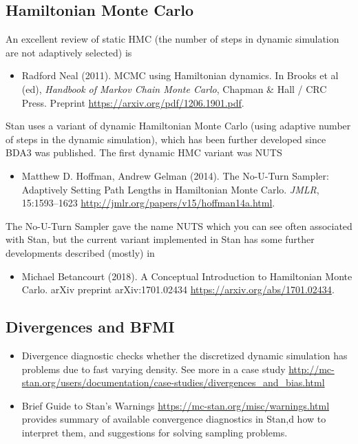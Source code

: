 \documentclass[a4paper,11pt,english]{article}
\begin{document}
\subsection*{Hamiltonian Monte Carlo}

An excellent review of static HMC (the number of steps in dynamic
simulation are not adaptively selected) is
\begin{itemize}
\item Radford Neal (2011). MCMC using Hamiltonian dynamics. In Brooks
  et al (ed), {\em Handbook of Markov Chain Monte Carlo}, Chapman \&
  Hall / CRC Press. Preprint \url{https://arxiv.org/pdf/1206.1901.pdf}.
\end{itemize}

Stan uses a variant of dynamic Hamiltonian Monte Carlo (using adaptive
number of steps in the dynamic simulation), which has been further
developed since BDA3 was published. The first dynamic HMC variant was NUTS
\begin{itemize}
\item Matthew D. Hoffman, Andrew Gelman (2014). The No-U-Turn Sampler:
  Adaptively Setting Path Lengths in Hamiltonian Monte Carlo. {\em
    JMLR},
  15:1593--1623 \url{http://jmlr.org/papers/v15/hoffman14a.html}.
\end{itemize}
The No-U-Turn Sampler gave the name NUTS which you can see often
associated with Stan, but the current variant implemented
in Stan has some further developments described (mostly) in
\begin{itemize}
\item Michael Betancourt (2018). A Conceptual Introduction to
  Hamiltonian Monte Carlo. arXiv preprint arXiv:1701.02434
  \url{https://arxiv.org/abs/1701.02434}.
\end{itemize}

\subsection*{Divergences and BFMI}

\begin{itemize}
\item Divergence diagnostic checks whether the discretized dynamic
simulation has problems due to fast varying density. See more in a
case study
\url{http://mc-stan.org/users/documentation/case-studies/divergences_and_bias.html}
\item Brief Guide to Stan's Warnings
  \url{https://mc-stan.org/misc/warnings.html} provides summary of
  available convergence diagnostics in Stan,d how to interpret them,
  and suggestions for solving sampling problems.
\end{itemize}
\end{document}
